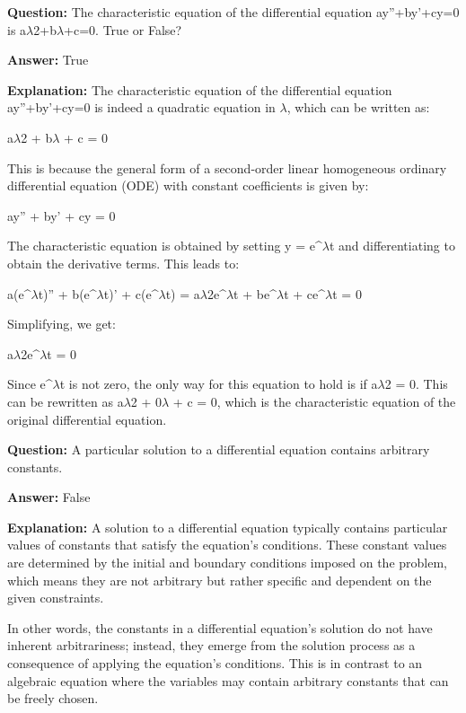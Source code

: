 \documentclass{article}
\begin{document}
                \vspace{0.5cm} 
        
            
                \textbf {Question:} The characteristic equation of the differential equation ay''+by'+cy=0 is a\ensuremath{\lambda}2+b\ensuremath{\lambda}+c=0. True or False?
                
                \textbf{Answer:} True

                \textbf{Explanation:} The characteristic equation of the differential equation ay''+by'+cy=0 is indeed a quadratic equation in \ensuremath{\lambda}, which can be written as:

a\ensuremath{\lambda}2 + b\ensuremath{\lambda} + c = 0

This is because the general form of a second-order linear homogeneous ordinary differential equation (ODE) with constant coefficients is given by:

ay'' + by' + cy = 0

The characteristic equation is obtained by setting y = e{\textasciicircum}\ensuremath{\lambda}t and differentiating to obtain the derivative terms. This leads to:

a(e{\textasciicircum}\ensuremath{\lambda}t)'' + b(e{\textasciicircum}\ensuremath{\lambda}t)' + c(e{\textasciicircum}\ensuremath{\lambda}t) = a\ensuremath{\lambda}2e{\textasciicircum}\ensuremath{\lambda}t + be{\textasciicircum}\ensuremath{\lambda}t + ce{\textasciicircum}\ensuremath{\lambda}t = 0

Simplifying, we get:

a\ensuremath{\lambda}2e{\textasciicircum}\ensuremath{\lambda}t = 0

Since e{\textasciicircum}\ensuremath{\lambda}t is not zero, the only way for this equation to hold is if a\ensuremath{\lambda}2 = 0. This can be rewritten as a\ensuremath{\lambda}2 + 0\ensuremath{\lambda} + c = 0, which is the characteristic equation of the original differential equation.
                
                \vspace{0.5cm} 
        
            
                \textbf {Question:} A particular solution to a differential equation contains arbitrary constants.
                
                \textbf{Answer:} False

                \textbf{Explanation:} A solution to a differential equation typically contains particular values of constants that satisfy the equation's conditions. These constant values are determined by the initial and boundary conditions imposed on the problem, which means they are not arbitrary but rather specific and dependent on the given constraints.

In other words, the constants in a differential equation's solution do not have inherent arbitrariness; instead, they emerge from the solution process as a consequence of applying the equation's conditions. This is in contrast to an algebraic equation where the variables may contain arbitrary constants that can be freely chosen.
                
                \vspace{0.5cm} 
        
            
\end{document}
